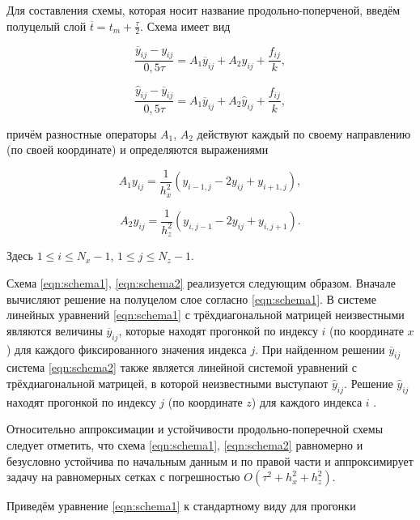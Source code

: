 \documentclass[12pt, a4paper]{article}
\begin{document}
Для составления схемы, которая носит название продольно-поперченой, введём полуцелый слой $\overline{t} = t_m + \frac\tau2$.
Схема имеет вид

\begin{equation}
	\label{eqn:schema1}
	\frac{\overline y_{ij} - y_{ij}}{0,5\tau} = A_1\overline y_{ij} + A_2y_{ij} + \frac{f_{ij}}k,
\end{equation}

\begin{equation}
	\label{eqn:schema2}
	\frac{\hat y_{ij} - \overline y_{ij}}{0,5\tau} = A_1\overline y_{ij} + A_2\hat y_{ij} + \frac{f_{ij}}k,
\end{equation}

\noindent причём разностные операторы $A_1$, $A_2$ действуют каждый по своему направлению (по своей координате) и определяются выражениями

\begin{equation}
	A_1 y_{ij} = \frac{1}{h_x^2} (y_{i - 1, j} - 2y_{ij} + y_{i + 1, j}),
\end{equation}

\begin{equation}
	A_2 y_{ij} = \frac{1}{h_z^2} (y_{i, j - 1} - 2y_{ij} + y_{i, j + 1}).
\end{equation}

Здесь $1 \leqslant i \leqslant N_x - 1$, $1 \leqslant j \leqslant N_z - 1$.

Схема \eqref{eqn:schema1}, \eqref{eqn:schema2} реализуется следующим образом.
Вначале вычисляют решение на полуцелом слое согласно \eqref{eqn:schema1}.
В системе линейных уравнений \eqref{eqn:schema1} с трёхдиагональной матрицей неизвестными являются величины $\overline y_{ij}$, которые находят прогонкой по индексу $i$ (по координате $x$) для каждого фиксированного значения индекса $j$.
При найденном решении $\overline y_{ij}$ система \eqref{eqn:schema2} также является линейной системой уравнений с трёхдиагональной матрицей, в которой неизвестными выступают $\hat y_{ij}$.
Решение $\hat y_{ij}$ находят прогонкой по индексу $j$ (по координате $z$) для каждого индекса $i$ \cite{1}.

Относительно аппроксимации и устойчивости продольно-поперечной схемы следует отметить, что схема \eqref{eqn:schema1}, \eqref{eqn:schema2} равномерно и безусловно устойчива по начальным данным и по правой части и аппроксимирует задачу на равномерных сетках с погрешностью $O(\tau^2 + h_x^2 + h_z^2)$.

Приведём уравнение \eqref{eqn:schema1} к стандартному виду для прогонки
\end{document}
